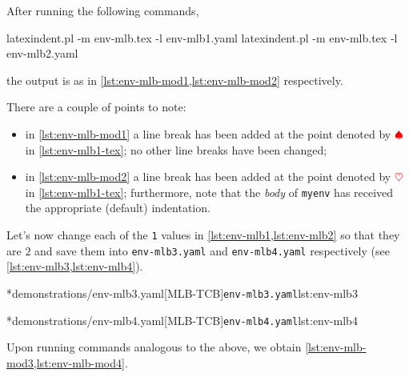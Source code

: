 	After running the following commands,
	\begin{commandshell}
latexindent.pl -m env-mlb.tex -l env-mlb1.yaml
latexindent.pl -m env-mlb.tex -l env-mlb2.yaml
\end{commandshell}
	the output is as in \cref{lst:env-mlb-mod1,lst:env-mlb-mod2} respectively.

	\begin{widepage}
		\begin{minipage}{.56\linewidth}
		\end{minipage}
		\hfill
		\begin{minipage}{.43\linewidth}
		\end{minipage}
	\end{widepage}

	There are a couple of points to note:
	\begin{itemize}
		\item in \cref{lst:env-mlb-mod1} a line break has been added at the point denoted by
		      $\color{red}\spadesuit$ in \cref{lst:env-mlb1-tex}; no other line breaks have been
		      changed;
		\item in \cref{lst:env-mlb-mod2} a line break has been added at the point denoted by
		      $\color{red}\heartsuit$ in \cref{lst:env-mlb1-tex}; furthermore, note that the
		      \emph{body} of \texttt{myenv} has received the appropriate
		      (default) indentation.
	\end{itemize}

	Let's now change each of the \texttt{1} values in
	\cref{lst:env-mlb1,lst:env-mlb2} so that they are $2$ and save them
	into \texttt{env-mlb3.yaml} and \texttt{env-mlb4.yaml} respectively (see
	\cref{lst:env-mlb3,lst:env-mlb4}).

	\begin{minipage}{.45\textwidth}
		\cmhlistingsfromfile[style=yaml-LST]*{demonstrations/env-mlb3.yaml}[MLB-TCB]{\texttt{env-mlb3.yaml}}{lst:env-mlb3}
	\end{minipage}
	\hfill
	\begin{minipage}{.45\textwidth}
		\cmhlistingsfromfile[style=yaml-LST]*{demonstrations/env-mlb4.yaml}[MLB-TCB]{\texttt{env-mlb4.yaml}}{lst:env-mlb4}
	\end{minipage}

	Upon running commands analogous to the above, we obtain \cref{lst:env-mlb-mod3,lst:env-mlb-mod4}.


